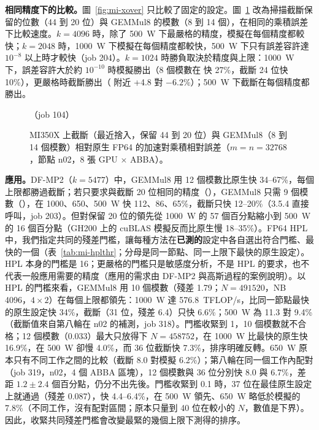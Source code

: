 \textbf{相同精度下的比較。}圖~\ref{fig:mi-xover} 只比較了固定的設定。圖~\ref{fig:mi-pareto} 改為掃描截斷保留的位數（44 到 20 位）與 GEMMul8 的模數（8 到 14 個），在相同的乘積誤差下比較速度。$k=4096$ 時，除了 500~W 下最嚴格的精度，模擬在每個精度都較快；$k=2048$ 時，1000~W 下模擬在每個精度都較快，500~W 下只有誤差容許達 $10^{-8}$ 以上時才較快（job 204）。$k=1024$ 時勝負取決於精度與上限：1000~W 下，誤差容許大於約 $10^{-10}$ 時模擬勝出（8 個模數在  快 27\%，截斷 24 位快 10\%），更嚴格時截斷勝出（ 附近 +4.8 對 $-6.2$\%）；500~W 下截斷在每個精度都勝出。

\begin{figure}[tbp]
\centering
{}
\caption[MI350X 上截斷與 GEMMul8 在相同精度下的比較]{MI350X 上截斷（最近捨入，保留 44 到 20 位）與 GEMMul8（8 到 14 個模數）相對原生 FP64 的加速對乘積相對誤差（$m=n=32768$，節點 n02，8 張 GPU × ABBA）。}\label{fig:mi-pareto}
\begin{figsource}（job 104）\end{figsource}
\end{figure}

\textbf{應用。}DF-MP2（$k=5477$）中，GEMMul8 用 12 個模數比原生快 34–67\%，每個上限都勝過截斷；若只要求與截斷 20 位相同的精度（\Eh），GEMMul8 只需 9 個模數（\Eh），在 1000、650、500~W 快 112、86、65\%，截斷只快 12–20\%（3.5.4 直接呼叫，job 203）。但對保留 20 位的領先從 1000~W 的 57 個百分點縮小到 500~W 的 16 個百分點（GH200 上的 cuBLAS 模擬反而比原生慢 18–35\%）。FP64 HPL 中，我們指定共同的殘差門檻，讓每種方法在\textbf{已測的}設定中各自選出符合門檻、最快的一個（表~\ref{tab:mi-hplthr}；分母是同一節點、同一上限下最快的原生設定）。HPL 本身的門檻是 16；更嚴格的門檻只是敏感度分析，不是 HPL 的要求，也不代表一般應用需要的精度（應用的需求由 DF-MP2 與高斯過程的案例說明）。以 HPL 的門檻來看，GEMMul8 用 10 個模數（殘差 1.79；$N=491520$，NB 4096，$4\times2$）在每個上限都領先：1000~W 達 576.8~TFLOP/s，比同一節點最快的原生設定快 34\%，截斷（31 位，殘差 6.4）只快 6.6\%；500~W 為 11.3 對 9.4\%（截斷值來自第八輪在 n02 的補測，job 318）。門檻收緊到 1，10 個模數就不合格；12 個模數（0.033）最大只放得下 $N=458752$，在 1000~W 比最快的原生快 16.9\%，在 500~W 卻慢 4.0\%，而 36 位截斷快 7.3\%，排序明確反轉。650~W 原本只有不同工作之間的比較（截斷 8.0 對模擬 6.2\%）；第八輪在同一個工作內配對（job 319，n02，4 個 ABBA 區塊），12 個模數與 36 位分別快 8.0 與 6.7\%，差距 $1.2\pm2.4$ 個百分點，仍分不出先後。門檻收緊到 0.1 時，37 位在最佳原生設定上就通過（殘差 0.087），快 4.4–6.4\%，在 500~W 領先、650~W 略低於模擬的 7.8\%（不同工作，沒有配對區間；原本只量到 40 位在較小的 $N$，數值是下界）。因此，收緊共同殘差門檻會改變最緊的幾個上限下測得的排序。


